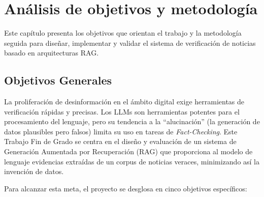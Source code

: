 
\chapter{Análisis de objetivos y metodología}
\label{cap:analisis}
Este capítulo presenta los objetivos que orientan el trabajo y la metodología seguida para diseñar, implementar y validar el sistema de verificación de noticias basado en arquitecturas RAG.

\section{Objetivos Generales}

La proliferación de desinformación en el ámbito digital exige herramientas de verificación rápidas y precisas. Los LLMs son herramientas potentes para el procesamiento del lenguaje, pero su tendencia a la ``alucinación'' (la generación de datos plausibles pero falsos) limita su uso en tareas de \textit{Fact-Checking}. Este Trabajo Fin de Grado se centra en el diseño y evaluación de un sistema de Generación Aumentada por Recuperación (RAG) que proporciona al modelo de lenguaje evidencias extraídas de un corpus de noticias veraces, minimizando así la invención de datos.

Para alcanzar esta meta, el proyecto se desglosa en cinco objetivos específicos:

